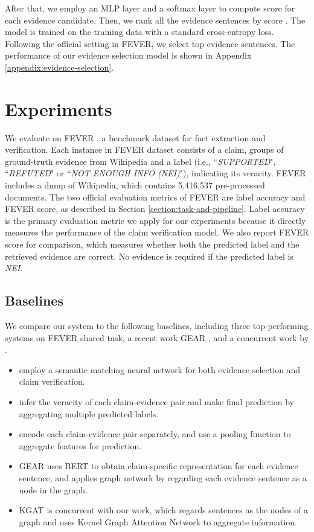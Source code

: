 \documentclass[11pt,a4paper]{article}
\begin{document}
After that, we employ an MLP layer and a softmax layer to compute score  for each evidence candidate.
Then, we rank all the evidence sentences by score . The model is trained on the training data with a standard cross-entropy loss. Following the official setting in FEVER, we select top  evidence sentences. The performance of our evidence selection model is shown in Appendix \ref{appendix:evidence-selection}.

\section{Experiments}
We evaluate on FEVER \cite{thorne2018fever}, a benchmark dataset for fact extraction and verification. 
Each instance in FEVER dataset consists of a claim, groups of ground-truth evidence from Wikipedia and a label (i.e., 
``\textsl{SUPPORTED}", ``\textsl{REFUTED}" or ``\textsl{NOT ENOUGH INFO (NEI)}"),
indicating its veracity. 
FEVER includes a dump of Wikipedia, which contains 5,416,537 pre-processed documents. 
The two official evaluation metrics of FEVER are {label accuracy} and {FEVER score}, as described in Section \ref{section:task-and-pipeline}.
Label accuracy is the primary evaluation metric we apply for our experiments because it directly measures the performance of the claim verification model. 
We also report FEVER score for comparison, which measures whether both the predicted label and the retrieved evidence are correct. 
No evidence is required if the predicted label is \textsl{NEI}.




\subsection{Baselines}


We compare our system to the following baselines, including three top-performing systems on FEVER shared task, a recent work GEAR \cite{zhou-etal-2019-gear}, and
a concurrent work by .


	\begin{itemize}
		\item {} employ a semantic matching neural network for both evidence selection and claim verification. 
\item {} infer the veracity of each claim-evidence pair and make final prediction by aggregating multiple predicted labels.
		\item  {} encode each claim-evidence pair separately, and use a pooling function to aggregate features for prediction.
\item GEAR \cite{zhou-etal-2019-gear} uses BERT to obtain claim-specific representation for each evidence sentence, and applies graph network by regarding each evidence sentence as a node in the graph.
\item KGAT \cite{liu2019kernel} is concurrent with our work, which regards sentences as the nodes of a graph and uses Kernel Graph Attention Network to aggregate information. 
\end{itemize}
\end{document}
